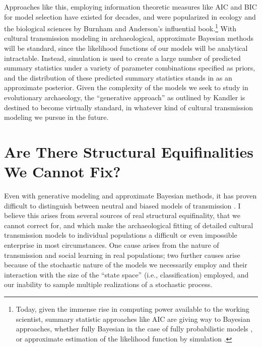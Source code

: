 Approaches like this, employing information theoretic measures like AIC and BIC for model selection have existed for decades, and were popularized in ecology and the biological sciences by Burnham and Anderson's \citeyearpar{burnham2002model} influential book.\footnote{Today, given the immense rise in computing power available to the working scientist, summary statistic approaches like AIC are giving way to Bayesian approaches, whether fully Bayesian in the case of fully probabilistic models \citep{gelman2013bayesian,mcelreath2020statistical,robert1994bayesian}, or approximate estimation of the likelihood function by simulation \citep{Beaumont2002,Toni2009,Beaumont2010ur,Csillery:2010jd,Marin2011,Marin2012,sisson2018handbook}.}  With cultural transmission modeling in archaeological, approximate Bayesian methods will be standard, since the likelihood functions of our models will be analytical intractable.  Instead, simulation is used to create a large number of predicted summary statistics under a variety of parameter combinations specified as priors, and the distribution of these predicted summary statistics stands in as an approximate posterior.  Given the complexity of the models we seek to study in evolutionary archaeology, the ``generative approach'' as outlined by Kandler is destined to become virtually standard, in whatever kind of cultural transmission modeling we pursue in the future. 

\section{Are There Structural Equifinalities We Cannot Fix?}

Even with generative modeling and approximate Bayesian methods, it has proven difficult to distinguish between neutral and biased models of transmission \citep{kandler2019analysing}.  I believe this arises from several sources of real structural equifinality, that we cannot correct for, and which make the archaeological fitting of detailed cultural transmission models to individual populations a difficult or even impossible enterprise in most circumstances.  One cause arises from the nature of transmission and social learning in real populations; two further causes arise because of the stochastic nature of the models we necessarily employ and their interaction with the size of the ``state space'' (i.e., classification) employed, and our inability to sample multiple realizations of a stochastic process.

